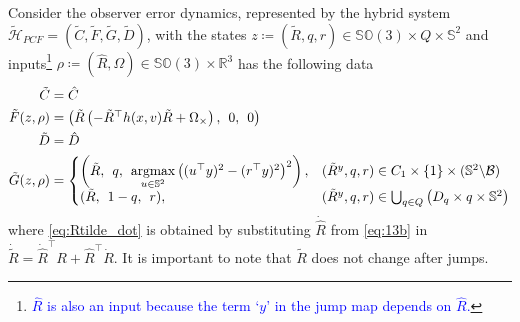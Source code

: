 \documentclass{article}
\newcommand{\SOthree}{\mathbb{SO}(3)}
\newcommand{\R}[1]{\mathbb{R}^{#1}}
\newtheorem{theorem}{Theorem}
\newcommand{\brackets}[1]{\left(#1\right)}
\newcommand{\textblue}[1]{\textcolor{blue}{#1}}
\newcommand{\Rtilde}{\tilde{R}}
\begin{document}
Consider the observer error dynamics, represented by the hybrid system $\tilde{\mathcal{H}}_{PCF} = (\tilde{C}, \tilde{F}, \tilde{G}, \tilde{D})$, with the states $z \coloneqq (\Rtilde, q, r) \in \SOthree\times Q \times \mathbb{S}^2$ and inputs\footnote{\textblue{$\hat{R}$ is also an input because the term `$y$' in the jump map depends on $\hat{R}$.}} $\rho \coloneqq (\hat{R}, \Omega)\in\SOthree\times \R{3}$ has the following data
\begin{subequations}\label{eq:hybrid_observer_error}
\begin{align}
\tilde{C}& = \hat{C}\\
\tilde{F}(z, \rho)& = \begin{pmatrix}
    \Rtilde\brackets{-\Rtilde^\top h(x, v) \Rtilde + \Omega_\times}, \:\: 0, \:\: 0\end{pmatrix} \label{eq:Rtilde_dot}\\
\tilde{D} &= \hat{D}\\
\tilde{G}(z, \rho) &= \left\{\begin{array}{@{}ll@{}}
    \brackets{\tilde{R}, \:\: q,\:\: \underset{u\in\mathbb{S}^2}{\mathrm{argmax}}\left((u^\top y)^2 - (r^\top y)^2\right)^2}, &(\Rtilde^y, q, r)\in C_1\times \{1\}\times (\mathbb{S}^2\backslash \mathcal{B})\\
        (\tilde{R}, \:\: 1-q,\:\: r),
    &(\Rtilde^y, q, r)\in \bigcup_{q\in Q} \brackets{{D}_{q}\times q\times \mathbb{S}^2}
\end{array}\right.
\end{align}
\end{subequations}
where \eqref{eq:Rtilde_dot} is obtained by substituting $\dot{\hat{R}}$ from \eqref{eq:13b} in $\dot{\Rtilde} = \dot{\hat{R}}^\top R + \hat{R}^\top \dot{R}$. It is important to note that $\Rtilde$ does not change after jumps. 

\end{document}
